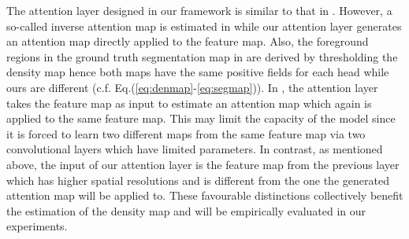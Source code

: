 \documentclass[journal,comsoc]{IEEEtran}
\begin{document}
The attention layer designed in our framework is similar to that in \cite{sindagi2019inverse,shi2019counting}. However, a so-called inverse attention map is estimated in \cite{sindagi2019inverse} while our attention layer generates an attention map directly applied to the feature map. Also, the foreground regions in the ground truth segmentation map in \cite{sindagi2019inverse} are derived by thresholding the density map hence both maps have the same positive fields for each head while ours are different (c.f. Eq.(\ref{eq:denmap}-\ref{eq:segmap})). In \cite{shi2019counting}, the attention layer takes the feature map as input to estimate an attention map which again is applied to the same feature map. This may limit the capacity of the model since it is forced to learn two different maps from the same feature map via two convolutional layers which have limited parameters. In contrast, as mentioned above, the input of our attention layer is the feature map from the previous layer which has higher spatial resolutions and is different from the one the generated attention map will be applied to. These favourable distinctions collectively benefit the estimation of the density map and will be empirically evaluated in our experiments.
\end{document}
